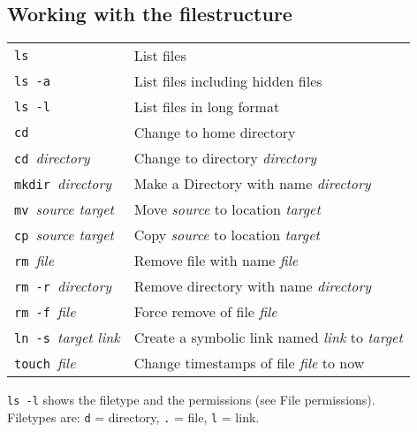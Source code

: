 \subsection{Working with the filestructure}
\begin{tabular}{@{}p{\the\MyLen}%
				@{}p{\linewidth-\the\MyLen}}
	\verb!ls!							& List files\\
	\verb!ls -a!						& List files including hidden files\\
	\verb!ls -l!						& List files in long format\\
	\verb!cd!							& Change to home directory\\
	\verb!cd !\textit{directory}		& Change to directory \textit{directory}\\
	\verb!mkdir !\textit{directory}		& Make a Directory with name \textit{directory}\\
	\verb!mv !\textit{source target}	& Move \textit{source} to location \textit{target}\\
	\verb!cp !\textit{source target}	& Copy \textit{source} to location \textit{target}\\
	\verb!rm !\textit{file}				& Remove file with name \textit{file}\\
	\verb!rm -r !\textit{directory}		& Remove directory with name \textit{directory}\\
	\verb!rm -f !\textit{file}			& Force remove of file \textit{file}\\
	\verb!ln -s !\textit{target link}	& Create a symbolic link named \textit{link} to \textit{target}\\
	\verb!touch !\textit{file}			& Change timestamps of file \textit{file} to now\\
\end{tabular}
\verb!ls -l! shows the filetype and the permissions (see File permissions).\\
Filetypes are: \verb!d! = directory, \verb!.! = file, \verb!l! = link.



